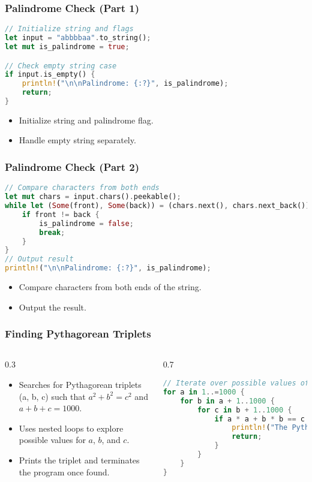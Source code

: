 \documentclass[aspectratio=169, table]{beamer}
\begin{document}
\begin{frame}[fragile]
\frametitle{Palindrome Check (Part 1)}
\begin{lstlisting}[language=Rust]
// Initialize string and flags
let input = "abbbbaa".to_string();
let mut is_palindrome = true;

// Check empty string case
if input.is_empty() {
	println!("\n\nPalindrome: {:?}", is_palindrome);
	return;
}
\end{lstlisting}
\begin{itemize}
\item Initialize string and palindrome flag.
\item Handle empty string separately.
\end{itemize}
\end{frame}

\begin{frame}[fragile]
\frametitle{Palindrome Check (Part 2)}
\begin{lstlisting}[language=Rust]
// Compare characters from both ends
let mut chars = input.chars().peekable();
while let (Some(front), Some(back)) = (chars.next(), chars.next_back()) {
	if front != back {
		is_palindrome = false;
		break;
	}
}
// Output result
println!("\n\nPalindrome: {:?}", is_palindrome);
\end{lstlisting}
\begin{itemize}
\item Compare characters from both ends of the string.
\item Output the result.
\end{itemize}
\end{frame}

\begin{frame}[fragile]
\frametitle{Finding Pythagorean Triplets}
\vspace{20pt}
\begin{columns}[t]
\begin{column}{0.3\textwidth}
\begin{itemize}
\item Searches for Pythagorean triplets (a, b, c) such that \(a^2 + b^2 = c^2\) and \(a + b + c = 1000\).
\item Uses nested loops to explore possible values for \(a\), \(b\), and \(c\).
\item Prints the triplet and terminates the program once found.
\end{itemize}
\end{column}

\begin{column}{0.7\textwidth}
\begin{lstlisting}[language=Rust]
// Iterate over possible values of a, b, and c
for a in 1..=1000 {
	for b in a + 1..1000 {
		for c in b + 1..1000 {
			if a * a + b * b == c * c && a + b + c == 1000 {
				println!("The Pythagorean triplet is ({}, {}, {})", a, b, c);
				return;
			}
		}
	}
}
\end{lstlisting}
\end{column}
\end{columns}
\end{frame}
\end{document}
